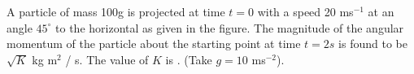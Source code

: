 \item A particle of mass 100g is projected at time \( t = 0 \) with a speed 20 ms\(^{-1}\) at an angle \( 45^\circ \) to the horizontal as given in the figure. The magnitude of the angular momentum of the particle about the starting point at time \( t = 2s \) is found to be \( \sqrt{K} \) kg m\(^2\) / s. The value of \( K \) is \underline{\hspace{2.5cm}}. (Take \( g = 10 \) ms\(^{-2} \)).
    \begin{center}
    \end{center}